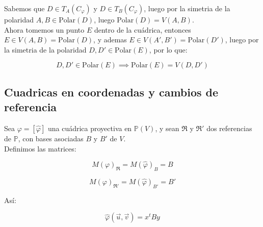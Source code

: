 \begin{center}
\end{center}

Sabemos que $D \in T_A (C_{\varphi})$ y $D \in T_B (C_{\varphi})$, luego por la simetria de la polaridad $A,B \in \text{Polar} (D)$, luego $\text{Polar} (D) = V(A,B)$.\\

Ahora tomemos un punto $E$ dentro de la cuádrica, entonces $E \in V(A,B) = \text{Polar} (D)$, y ademas $E \in V(A',B') = \text{Polar} (D')$, luego por la simetria de la polaridad $D,D' \in \text{Polar} (E)$, por lo que:

\[
D,D' \in \text{Polar} (E) \implies
\text{Polar} (E) = V(D,D')
\]

\subsection{Cuadricas en coordenadas y cambios de referencia}

Sea $\varphi = [\hat{\varphi}]$ una cuádrica proyectiva en $\mathbb{P}(V)$, y sean $\mathfrak{R}$ y $\mathfrak{R'}$ dos referencias de $\mathbb{P}$, con bases asociadas $B$ y $B'$ de $V$.\\

Definimos las matrices:

\[
    M(\varphi)_{\mathfrak{R}} =
    M(\hat{\varphi})_B =
    B
\]

\[
    M(\varphi)_{\mathfrak{R}'} =
    M(\hat{\varphi})_{B'} =
    B'
\]

Así:

\[
    \hat{\varphi}(\vec{u}, \vec{v}) =
    x^t B y
\]

